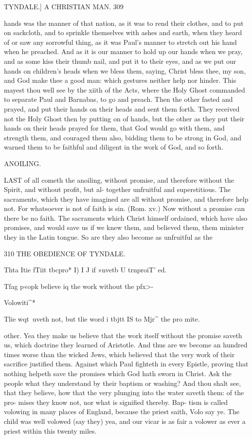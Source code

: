 \documentclass{custom}
\begin{document}
{TYNDALE.] A CHRISTIAN MAN. 309

hands was the manner of that nation, as it was to rend 
their clothes, and to put on sackcloth, and to sprinkle 
themselves with ashes and earth, when they heard of or 
saw any sorrowful thing, as it was Paul's manner to 
stretch out his hand when he preached. And as it 
is our manner to hold up our hands when we pray, and 
as some kiss their thumb nail, and put it to their eyes, 
and as we put our hands on children's heads when we 
bless them, saying, Christ bless thee, my son, and God 
make thee a good man: which gestures neither help nor 
hinder. This mayest thou well see by the xiith of the 
Acts, where the Holy Ghost commanded to separate 
Paul and Barnabas, to go and preach. Then the other 
fasted and prayed, and put their hands on their heads and 
sent them forth. They received not the Holy Ghost 
then by putting on of hands, but the other as they put 
their hands on their heads prayed for them, that God 
would go with them, and strength them, and couraged 
them also, bidding them to be strong in God, and 
warned them to be faithful and diligent in the work of 
God, and so forth. 


ANOILING. 

LAST of all cometh the anoiling, without promise, and 
therefore without the Spirit, and without profit, but al- 
together unfruitful and superstitious. The sacraments, 
which they have imagined are all without promise, and 
therefore help not. For whatsoever is not of faith is sin. 
(Rom. xv.) Now without a promise can there be no
faith. The sacraments which Christ himself ordained,
which have also promises, and would save us if we knew
them, and believed them, them minister they in the Latin
tongue. So are they also become as unfruitful as the


310
THE OBEDIENCE OF
TYNDALE.

Thta Itie 
fTiit tbcpro* 
I) I J if »nvetb 
U trnproiT' 
ed. 

Tfag p«opk 
believe iq 
the work 
without 
the pfx>- 

Volowiti^* 

Tlie wqt\ 
uveth not, 
but tlie 
word i tbjtt 
IS to Mjr^ 
the pro 
mite. 

other. Yea they make us believe that the work itself 
without the promise saveth us, which doctrine they learned 
of Aristotle. And thus are we become an hundred times 
worse than the wicked Jews, which believed that the very 
work of their sacrifice justified them. Against which 
Paul fighteth in every Epistle, proving that nothing helpeth 
save the promises which God hath sworn in Christ. 
Ask the people what they understand by their baptism or 
washing? And thou shalt see, that they believe, how that 
the very plunging into the water saveth them: of the pro- 
mises they know not, nor what is signified thereby. Bap- 
tism is called volowing in many places of England, because 
the priest saith, Volo say ye. The child was well volowed 
(say they) yea, and our vicar is as fair a volower as ever a 
priest within this twenty miles. 

}
\end{document}

